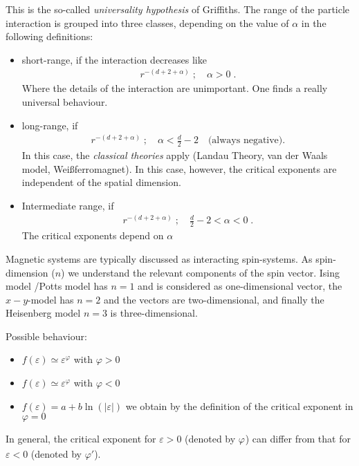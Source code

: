 This is the so-called {\em universality hypothesis} of Griffiths.
The range of the particle interaction is grouped into three classes, depending on the value of $\alpha$ in the following definitions:
\begin{itemize}
	\item short-range, if the interaction decreases like
%
\begin{align*}
r^{-(d+2+\alpha)}\;;\quad \alpha > 0\;.
\end{align*}
%
Where the details of the interaction are unimportant.
One finds a really universal behaviour.
\item  long-range, if  
%
\begin{align*}
r^{-(d+2+\alpha)}\;;\quad \alpha< \frac{d}{2}-2\quad\text{(always negative)}.
\end{align*}
%  
In this case, the {\em classical theories} apply (Landau Theory, van der Waals model, Weißferromagnet). In this case, however, the critical exponents are independent of the spatial dimension. 
 \item Intermediate range, if 
\begin{align*}
r^{-(d+2+\alpha)}\;;\quad \frac{d}{2}-2 < \alpha < 0\;.
\end{align*}
%
The critical exponents depend on $\alpha$
\end{itemize}


Magnetic systems are typically discussed as interacting spin-systems. As spin-dimension ($n$) we understand the relevant components of the spin vector. Ising model /Potts model has $n=1$ and is considered as one-dimensional vector, the $x-y$-model has $n=2$ and the vectors are two-dimensional, and finally the Heisenberg model $n=3$ is three-dimensional. 

Possible behaviour:

\begin{itemize}
	\item{} $f(\varepsilon)\simeq \varepsilon^{\varphi}$ with $\varphi >0$
	\item{} $f(\varepsilon)\simeq \varepsilon^{\varphi}$ with $\varphi <0$ 
	\item{} $f(\varepsilon) = a + b\ln(|\varepsilon|)$ we obtain by
	the definition of the critical exponent in  $\varphi =0$ 
\end{itemize}
In general, the critical exponent for $\varepsilon>0$ (denoted by $\varphi_{}$) can differ from that for $\varepsilon<0$ (denoted by $\varphi'$).

